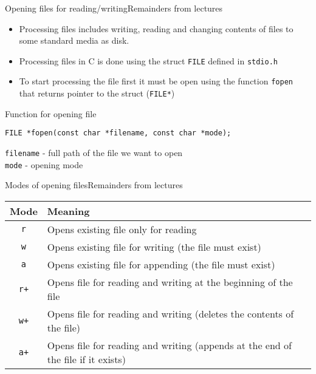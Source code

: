 
\begin{frame}[fragile]{Opening files for reading/writing}{Remainders from
lectures}

\begin{itemize}
  \item Processing files includes writing, reading and changing
  contents of files to some standard media as disk.
  \item Processing files in C is done using the struct \texttt{FILE} defined in
  \texttt{stdio.h}
  \item To start processing the file first it must be open using the function
  \texttt{fopen} that returns pointer to the struct (\texttt{FILE*})
\end{itemize}
\begin{exampleblock}{Function for opening file}
\begin{lstlisting}
FILE *fopen(const char *filename, const char *mode);
\end{lstlisting}
\begin{scriptsize}
\texttt{filename} - full path of the file we want to open\\
\texttt{mode} - opening mode
\end{scriptsize}
\end{exampleblock}
\end{frame}

\begin{frame}{Modes of opening files}{Remainders from
lectures}
\begin{tabular}{| c | p{} |}
\hline
\textbf{Mode} & \textbf{Meaning}\\
\hline
\texttt{r}  &  Opens existing file only for reading\\
\hline
\texttt{w} & Opens existing file for writing (the file must exist)\\
\hline
 \texttt{a} & Opens existing file for appending (the file must exist)\\
 \hline
 \texttt{r+} & Opens file for reading and writing at the
 beginning of the file\\
 \hline
 \texttt{w+} & Opens file for reading and writing (deletes the contents of the
 file)\\
 \hline
 \texttt{a+} & Opens file for reading and writing (appends at the end of
 the file if it exists)\\
 \hline
\end{tabular}
\end{frame}

